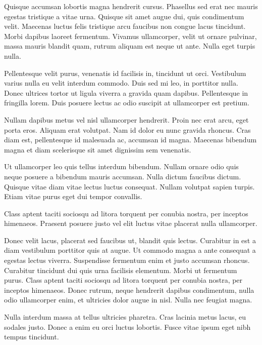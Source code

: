 \documentclass[12pt,a4paper]{report}
\begin{document}
Quisque accumsan lobortis magna hendrerit cursus. Phasellus sed erat nec mauris egestas tristique a vitae urna. Quisque sit amet augue dui, quis condimentum velit. Maecenas luctus felis tristique arcu faucibus non congue lacus tincidunt. Morbi dapibus laoreet fermentum. Vivamus ullamcorper, velit ut ornare pulvinar, massa mauris blandit quam, rutrum aliquam est neque ut ante. Nulla eget turpis nulla. 

Pellentesque velit purus, venenatis id facilisis in, tincidunt ut orci. Vestibulum varius nulla eu velit interdum commodo. Duis sed mi leo, in porttitor nulla. Donec ultrices tortor ut ligula viverra a gravida quam dapibus. Pellentesque in fringilla lorem. Duis posuere lectus ac odio suscipit at ullamcorper est pretium.

Nullam dapibus metus vel nisl ullamcorper hendrerit. Proin nec erat arcu, eget porta eros. Aliquam erat volutpat. Nam id dolor eu nunc gravida rhoncus. Cras diam est, pellentesque id malesuada ac, accumsan id magna. Maecenas bibendum magna et diam scelerisque sit amet dignissim sem venenatis. 

Ut ullamcorper leo quis tellus interdum bibendum. Nullam ornare odio quis neque posuere a bibendum mauris accumsan. Nulla dictum faucibus dictum. Quisque vitae diam vitae lectus luctus consequat. Nullam volutpat sapien turpis. Etiam vitae purus eget dui tempor convallis. 

Class aptent taciti sociosqu ad litora torquent per conubia nostra, per inceptos himenaeos. Praesent posuere justo vel elit luctus vitae placerat nulla ullamcorper.

Donec velit lacus, placerat sed faucibus ut, blandit quis lectus. Curabitur in est a diam vestibulum porttitor quis at augue. Ut commodo magna a ante consequat a egestas lectus viverra. Suspendisse fermentum enim et justo accumsan rhoncus. Curabitur tincidunt dui quis urna facilisis elementum. Morbi ut fermentum purus. Class aptent taciti sociosqu ad litora torquent per conubia nostra, per inceptos himenaeos. Donec rutrum, neque hendrerit dapibus condimentum, nulla odio ullamcorper enim, et ultricies dolor augue in nisl. Nulla nec feugiat magna. 

Nulla interdum massa at tellus ultricies pharetra. Cras lacinia metus lacus, eu sodales justo. Donec a enim eu orci luctus lobortis. Fusce vitae ipsum eget nibh tempus tincidunt.





\end{document}

